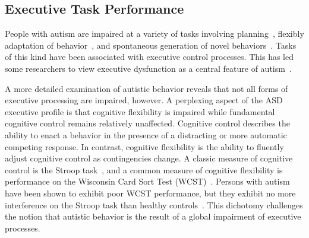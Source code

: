 %
%

\subsection{Executive Task Performance}

People with autism are impaired at a variety of tasks involving planning~\cite{BennettoL:1996:AutismPlanningWCST}, flexibly adaptation of behavior~\cite{BennettoL:1996:AutismPlanningWCST,Ozonoff:1999:AutismStroopWCST}, and spontaneous generation of novel behaviors~\cite{TurnerW:1999:AutismGenerativity}. Tasks of this kind have been associated with executive control processes. This has led some researchers to view executive dysfunction as a central feature of autism~\cite{HughesC:1994:AutismExecutiveDysfunction}.


A more detailed examination of autistic behavior reveals that not all forms of executive processing are impaired, however. A perplexing aspect of the ASD executive profile is that cognitive flexibility is impaired while fundamental cognitive control remains relatively unaffected. Cognitive control describes the ability to enact a behavior in the presence of a distracting or more automatic competing response. In contrast, cognitive flexibility is the ability to fluently adjust cognitive control as contingencies change. A classic measure of cognitive control is the Stroop task~\cite{StroopJR:1935:Interference}, and a common measure of cognitive flexibility is performance on the Wisconsin Card Sort Test (WCST)~\cite{BergEA:1948:WCST}. Persons with autism have been shown to exhibit poor WCST performance, but they exhibit no more interference on the Stroop task than healthy controls~\cite{Ozonoff:1999:AutismStroopWCST}. This dichotomy challenges the notion that autistic behavior is the result of a global impairment of executive processes.

